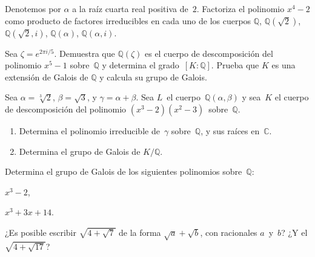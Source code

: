 \documentclass[12pt]{article}
\begin{document}
    \begin{exercise}[16.7.8]
        Denotemos por $\alpha$ a la raíz cuarta real positiva de~$2$. Factoriza el polinomio $x^{4}-2$ como producto de factores irreducibles en cada uno de los cuerpos $\mathbb{Q}$, $\mathbb{Q}(\sqrt{2})$, $\mathbb{Q}(\sqrt{2},i)$, $\mathbb{Q}(\alpha)$, $\mathbb{Q}(\alpha,i)$.
    \end{exercise}
    
    
    \begin{exercise}[16.7.9]
        Sea $\zeta=e^{2\pi i/5}$. Demuestra que $\mathbb{Q}(\zeta)$ es el cuerpo de descomposición del polinomio $x^{5}-1$ sobre~$\mathbb{Q}$ y determina el grado~$[K:\mathbb{Q}]$. Prueba que $K$ es una extensión de Galois de $\mathbb{Q}$ y calcula su grupo de Galois.
    \end{exercise}
    
    \begin{exercise}[16.7.11]
        Sea $\alpha=\sqrt[3]{2}$, $\beta=\sqrt{3}$, y $\gamma=\alpha+\beta$. Sea $L$~el cuerpo~$\mathbb{Q}(\alpha,\beta)$ y sea~$K$ el cuerpo de descomposición del polinomio $(x^{3}-2)(x^{2}-3)$~sobre~$\mathbb{Q}$.
        \begin{enumerate}[\bfseries(a)]
            \item Determina el polinomio irreducible de~$\gamma$ sobre~$\mathbb{Q}$, y sus raíces en~$\mathbb{C}$.
            \item Determina el grupo de Galois de $K/\mathbb{Q}$.
        \end{enumerate}
    \end{exercise}
    
    
    \begin{exercise}[16.8.2]
        Determina el grupo de Galois de los siguientes polinomios sobre~$\mathbb{Q}$:
        
        \noindent
        \begin{inparaenum}[\bfseries(a)]
            \item $x^{3}-2$,
            \item $x^{3}+3x+14$.
        \end{inparaenum}
    \end{exercise}
    
    
    \begin{exercise}[16.9.3]
        ¿Es posible escribir $\sqrt{4+\sqrt{7}}$ de la forma $\sqrt{a}+\sqrt{b}$, con racionales $a$~y~$b$? ¿Y el $\sqrt{4+\sqrt{17}}$?
    \end{exercise}
    
\end{document}
